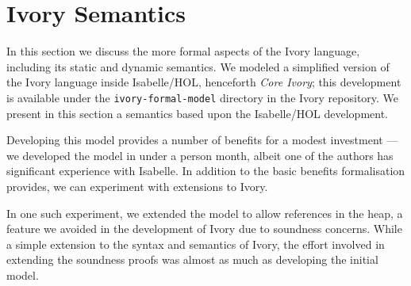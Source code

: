 \newcommand{\coreivory}{Core Ivory}

\section{Ivory Semantics}
\label{sec:semantics}

In this section we discuss the more formal aspects of the Ivory
language, including its static and dynamic semantics.  We modeled a
simplified version of the Ivory language inside
Isabelle/HOL, henceforth \emph{\coreivory{}}; this
development is available under the \texttt{ivory-formal-model}
directory in the Ivory repository.  We present in this section a
semantics based upon the Isabelle/HOL development.

Developing this model provides a number of benefits for a modest
investment --- we developed the model in under a person month, albeit
one of the authors has significant experience with Isabelle.  In
addition to the basic benefits formalisation provides, we can
experiment with extensions to Ivory.

In one such experiment, we extended the model to allow references in
the heap, a feature we avoided in the development of Ivory due to
soundness concerns.  While a simple extension to the syntax and
semantics of Ivory, the effort involved in extending the soundness
proofs was almost as much as developing the initial model.  

\newcommand{\sep}{\ |\ }


